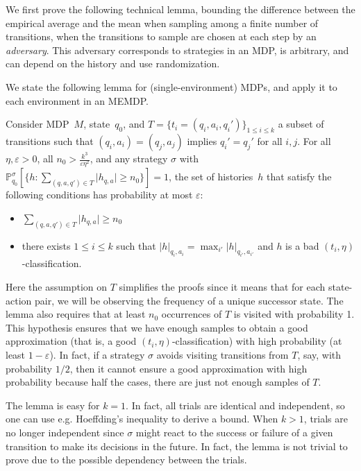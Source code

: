 \documentclass[a4paper,USenglish,cleveref, autoref, thm-restate]{lipics-v2021}
\let\epsilon\varepsilon
\def\abs#1{\ensuremath{\lvert #1 \rvert}}
\newcommand*{\pr}{\mathbb{P}}
\begin{document}
We first prove the following technical lemma, bounding the difference between the empirical average and the mean when sampling among a finite number of
transitions, when the transitions to sample are chosen at each step by an \emph{adversary}. This adversary corresponds to strategies in an MDP, is arbitrary,
and can depend on the history and use randomization.

We state the following lemma for (single-environment) MDPs, and apply it to each environment in an MEMDP.
\begin{lemma}
  \label{lemma:adversarial-sampling}
  Consider MDP~$M$, state~$q_0$, and $T=\{t_i = (q_i,a_i,q_i')\}_{1\leq i \leq k}$ a subset of transitions
  such that $(q_i,a_i)=(q_j,a_j)$ implies $q_i'=q_j'$ for all $i,j$.
  For all $\eta,\epsilon>0$, all $n_0>\frac{k^3}{\epsilon\eta^2}$, and any strategy $\sigma$ with
  $\pr_{q_0}^\sigma\left[\{h : \sum_{(q,a,q') \in T} \abs{h_{q,a}} \geq n_0\}\right]=1$, the set of histories~$h$ that satisfy the following conditions
  has probability at most $\epsilon$:
  \begin{itemize}
    \item $\sum_{(q,a,q') \in T} \abs{h_{q,a}} \geq n_0$
    \item there exists $1{\leq} i {\leq} k$ such that $\abs{h}_{q_i,a_i} {=} \max_{i'} \abs{h}_{q_{i'},a_{i'}}$
    and $h$ is a bad $(t_i,\eta)$-classification.
  \end{itemize}
\end{lemma}

Here the assumption on $T$ simplifies the proofs since it means that for each state-action pair, 
we will be observing the frequency of a unique successor state.
The lemma also requires that at least $n_0$ occurrences of $T$ is visited with probability 1. This hypothesis ensures that we have enough samples
to obtain a good approximation (that is, a good $(t_i,\eta)$-classification) with high probability (at least $1-\epsilon$).
In fact, if a strategy $\sigma$ avoids visiting transitions from $T$, say, with probability $1/2$, then it cannot ensure a good approximation with high probability because half the cases, there are just not enough samples of $T$.

The lemma is easy for $k=1$. In fact, all trials are identical and independent, so one can use e.g. Hoeffding's inequality to derive a bound.
When $k>1$, trials are no longer independent since $\sigma$ might react to the success or failure of a given transition to make its decisions in the future.
In fact, the lemma is not trivial to prove due to the possible dependency between the trials.
\end{document}
